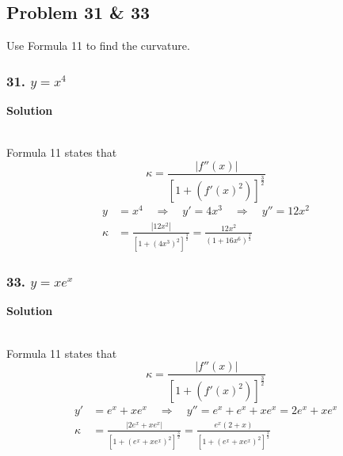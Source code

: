 \documentclass{article}
\newcommand\rr{\quad\Rightarrow\quad}
\begin{document}
\subsection*{Problem 31 \& 33}

Use Formula 11 to find the curvature.

\subsubsection*{31. $y = x^4$}
\centerline{\textbf{Solution}} \\
Formula 11 states that 
\[
    \kappa = \frac{|f''(x)|}{[1 + (f'(x)^2)]^{\frac 3 2}}
\]
\begin{align*}
    y &= x^4 \rr y' = 4x^3 \rr y'' = 12x^2 \\
    \kappa &= \frac{|12x^2|}{[1+(4x^3)^2]^{\frac 3 2}} = \frac{12x^2}{(1+16x^6)^{\frac{3}{2}}}
\end{align*}
\subsubsection*{33. $y = xe^x$}
\centerline{\textbf{Solution}} \\
Formula 11 states that 
\[
    \kappa = \frac{|f''(x)|}{[1 + (f'(x)^2)]^{\frac 3 2}}
\]
\begin{align*}
    y' &= e^x + xe^x \rr y'' = e^x + e^x + xe^x = 2e^x + xe^x \\
    \kappa &= \frac {|2e^x + xe^x|} {[1+ (e^x + xe^x)^2]^{\frac 3 2}} = \frac {e^x(2 + x)} {[1+ (e^x + xe^x)^2]^{\frac 3 2}}
\end{align*}
\end{document}
